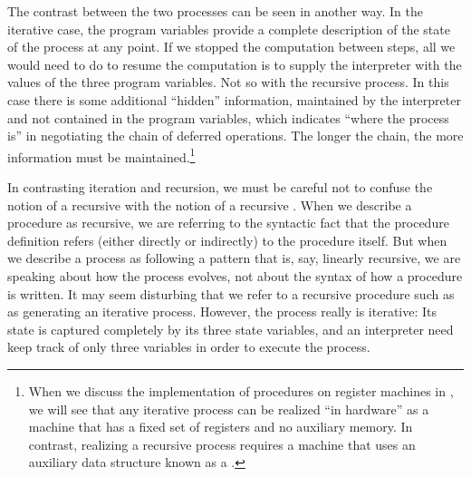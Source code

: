 The contrast between the two processes can be seen in another way.  In the
iterative case, the program variables provide a complete description of the
state of the process at any point.  If we stopped the computation between
steps, all we would need to do to resume the computation is to supply the
interpreter with the values of the three program variables.  Not so with the
recursive process.  In this case there is some additional ``hidden''
information, maintained by the interpreter and not contained in the program
variables, which indicates ``where the process is'' in negotiating the chain of
deferred operations.  The longer the chain, the more information must be
maintained.\footnote{When we discuss the implementation of procedures on
register machines in , we will see that any iterative process
can be realized ``in hardware'' as a machine that has a fixed set of registers
and no auxiliary memory.  In contrast, realizing a recursive process requires a
machine that uses an auxiliary data structure known as a .}

In contrasting iteration and recursion, we must be careful not to confuse the
notion of a recursive  with the notion of a recursive
.  When we describe a procedure as recursive, we are
referring to the syntactic fact that the procedure definition refers (either
directly or indirectly) to the procedure itself.  But when we describe a
process as following a pattern that is, say, linearly recursive, we are
speaking about how the process evolves, not about the syntax of how a procedure
is written.  It may seem disturbing that we refer to a recursive procedure such
as  as generating an iterative process.  However, the process
really is iterative: Its state is captured completely by its three state
variables, and an interpreter need keep track of only three variables in order
to execute the process.

